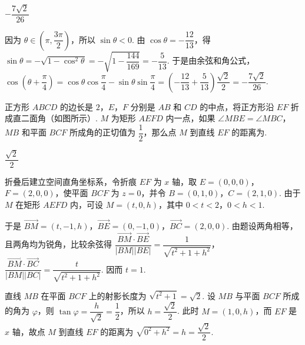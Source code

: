 \begin{answer}
\(-\dfrac{7\sqrt{2}}{26}\)
\end{answer}

\begin{solution}
因为 \(\theta\in\left(\pi,\dfrac{3\pi}{2}\right)\)，所以 \(\sin\theta<0\). 由 \(\cos\theta=-\dfrac{12}{13}\)，得
\(\sin\theta=-\sqrt{1-\cos^{2}\theta}=-\sqrt{1-\dfrac{144}{169}}=-\dfrac{5}{13}\). 于是由余弦和角公式，
\(\cos\left(\theta+\dfrac{\pi}{4}\right)=\cos\theta\cos\dfrac{\pi}{4}-\sin\theta\sin\dfrac{\pi}{4}=\left(-\dfrac{12}{13}+\dfrac{5}{13}\right)\dfrac{\sqrt{2}}{2}=-\dfrac{7\sqrt{2}}{26}\).
\end{solution}

\begin{problem}
正方形 \(ABCD\) 的边长是 \(2\)，\(E\)，\(F\) 分别是 \(AB\) 和 \(CD\) 的中点，将正方形沿 \(EF\) 折成直二面角（如图所示）. \(M\) 为矩形 \(AEFD\) 内一点，如果 \(\angle MBE=\angle MBC\)，\(MB\) 和平面 \(BCF\) 所成角的正切值为 \(\dfrac{1}{2}\)，那么点 \(M\) 到直线 \(EF\) 的距离为\fillinblank{}.
\end{problem}

\begin{answer}
\(\dfrac{\sqrt{2}}{2}\)
\end{answer}

\begin{solution}
折叠后建立空间直角坐标系，令折痕 \(EF\) 为 \(x\) 轴，取 \(E=(0,0,0)\)，\(F=(2,0,0)\)，使平面 \(BCF\) 为 \(z=0\)，并令 \(B=(0,1,0)\)，\(C=(2,1,0)\). 由于 \(M\) 在矩形 \(AEFD\) 内，可设 \(M=(t,0,h)\)，其中 \(0<t<2\)，\(0<h<1\).

于是 \(\overrightarrow{BM}=(t,-1,h)\)，\(\overrightarrow{BE}=(0,-1,0)\)，\(\overrightarrow{BC}=(2,0,0)\). 由题设两角相等，且两角均为锐角，比较余弦得
\(\dfrac{\overrightarrow{BM}\cdot\overrightarrow{BE}}{\lvert BM\rvert\lvert BE\rvert}=\dfrac{1}{\sqrt{t^{2}+1+h^{2}}}\)，\(\dfrac{\overrightarrow{BM}\cdot\overrightarrow{BC}}{\lvert BM\rvert\lvert BC\rvert}=\dfrac{t}{\sqrt{t^{2}+1+h^{2}}}\). 因而 \(t=1\).

直线 \(MB\) 在平面 \(BCF\) 上的射影长度为 \(\sqrt{t^{2}+1}=\sqrt{2}\). 设 \(MB\) 与平面 \(BCF\) 所成的角为 \(\varphi\)，则 \(\tan\varphi=\dfrac{h}{\sqrt{2}}=\dfrac{1}{2}\)，所以 \(h=\dfrac{\sqrt{2}}{2}\). 此时 \(M=(1,0,h)\)，而 \(EF\) 是 \(x\) 轴，故点 \(M\) 到直线 \(EF\) 的距离为 \(\sqrt{0^{2}+h^{2}}=h=\dfrac{\sqrt{2}}{2}\).
\end{solution}

